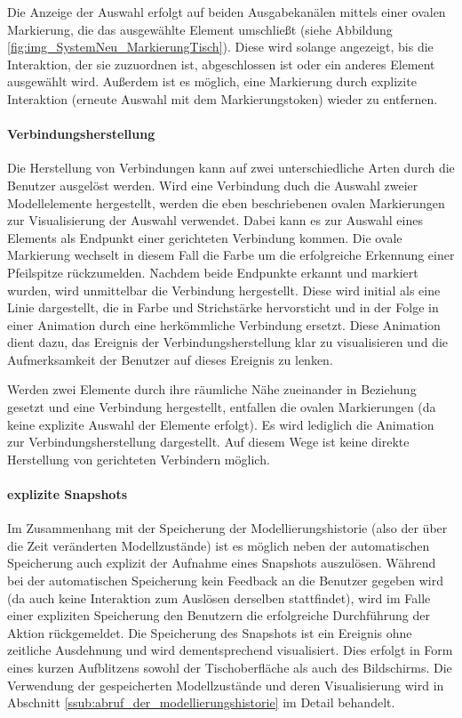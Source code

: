 Die Anzeige der Auswahl erfolgt auf beiden Ausgabekanälen mittels einer ovalen Markierung, die das ausgewählte Element umschließt (siehe Abbildung \ref{fig:img_SystemNeu_MarkierungTisch}). Diese wird solange angezeigt, bis die Interaktion, der sie zuzuordnen ist, abgeschlossen ist oder ein anderes Element ausgewählt wird. Außerdem ist es möglich, eine Markierung durch explizite Interaktion (erneute Auswahl mit dem Markierungstoken) wieder zu entfernen.

\paragraph{Verbindungsherstellung}

Die Herstellung von Verbindungen kann auf zwei unterschiedliche Arten durch die Benutzer ausgelöst werden. Wird eine Verbindung duch die Auswahl zweier Modellelemente hergestellt, werden die eben beschriebenen ovalen Markierungen zur Visualisierung der Auswahl verwendet. Dabei kann es zur Auswahl eines Elements als Endpunkt einer gerichteten Verbindung kommen. Die ovale Markierung wechselt in diesem Fall die Farbe um die erfolgreiche Erkennung einer Pfeilspitze rückzumelden. Nachdem beide Endpunkte erkannt und markiert wurden, wird unmittelbar die Verbindung hergestellt. Diese wird initial als eine Linie dargestellt, die in Farbe und Strichstärke hervorsticht und in der Folge in einer Animation durch eine herkömmliche Verbindung ersetzt. Diese Animation dient dazu, das Ereignis der Verbindungsherstellung klar zu visualisieren und die Aufmerksamkeit der Benutzer auf dieses Ereignis zu lenken.

Werden zwei Elemente durch ihre räumliche Nähe zueinander in Beziehung gesetzt und eine Verbindung hergestellt, entfallen die ovalen Markierungen (da keine explizite Auswahl der Elemente erfolgt). Es wird lediglich die Animation zur Verbindungsherstellung dargestellt. Auf diesem Wege ist keine direkte Herstellung von gerichteten Verbindern möglich. 

\paragraph{explizite Snapshots}

Im Zusammenhang mit der Speicherung der Modellierungshistorie (also der über die Zeit veränderten Modellzustände) ist es möglich neben der automatischen Speicherung auch explizit der Aufnahme eines Snapshots auszulösen. Während bei der automatischen Speicherung kein Feedback an die Benutzer gegeben wird (da auch keine Interaktion zum Auslösen derselben stattfindet), wird im Falle einer expliziten Speicherung den Benutzern die erfolgreiche Durchführung der Aktion rückgemeldet. Die Speicherung des Snapshots ist ein Ereignis ohne zeitliche Ausdehnung und wird dementsprechend visualisiert. Dies erfolgt in Form eines kurzen Aufblitzens sowohl der Tischoberfläche als auch des Bildschirms. Die Verwendung der gespeicherten Modellzustände und deren Visualisierung wird in Abschnitt \ref{ssub:abruf_der_modellierungshistorie} im Detail behandelt.

